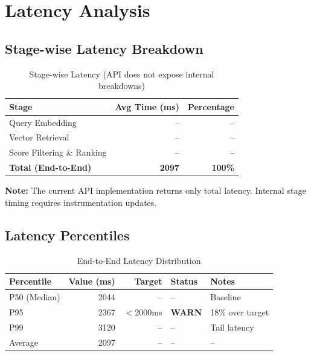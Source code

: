 \documentclass[11pt,a4paper]{article}
\newcommand{\warnmark}{\textcolor{warn}{\textbf{WARN}}}
\begin{document}
\section{Latency Analysis}

\subsection{Stage-wise Latency Breakdown}

\begin{table}[H]
\centering
\begin{tabular}{lrr}
\toprule
\textbf{Stage} & \textbf{Avg Time (ms)} & \textbf{Percentage} \\
\midrule
Query Embedding & -- & -- \\
Vector Retrieval & -- & -- \\
Score Filtering \& Ranking & -- & -- \\
\midrule
\textbf{Total (End-to-End)} & \textbf{2097} & \textbf{100\%} \\
\bottomrule
\end{tabular}
\caption{Stage-wise Latency (API does not expose internal breakdowns)}
\end{table}

\textbf{Note:} The current API implementation returns only total latency. Internal stage timing requires instrumentation updates.

\subsection{Latency Percentiles}

\begin{table}[H]
\centering
\begin{tabular}{lrrll}
\toprule
\textbf{Percentile} & \textbf{Value (ms)} & \textbf{Target} & \textbf{Status} & \textbf{Notes} \\
\midrule
P50 (Median) & 2044 & -- & -- & Baseline \\
P95 & 2367 & $<$2000ms & \warnmark & 18\% over target \\
P99 & 3120 & -- & -- & Tail latency \\
Average & 2097 & -- & -- & -- \\
\bottomrule
\end{tabular}
\caption{End-to-End Latency Distribution}
\end{table}
\end{document}
